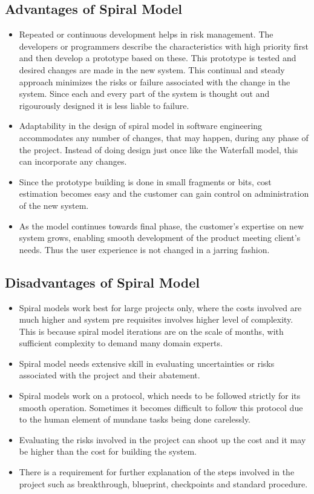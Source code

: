 \documentclass{article}
\begin{document}
\subsection{Advantages of Spiral Model}
\begin{itemize}
\item Repeated or continuous development helps in risk management. The developers or programmers describe the characteristics with high priority first and then develop a prototype based on these. This prototype is tested and desired changes are made in the new system. This continual and steady approach minimizes the risks or failure associated with the change in the system. Since each and every part of
the system is thought out and rigourously designed it is less liable to failure.
\item Adaptability in the design of spiral model in software engineering accommodates any number of changes, that may happen, during any phase of the project. Instead of doing design just once like the Waterfall model, this can incorporate any changes.
\item Since the prototype building is done in small fragments or bits, cost estimation becomes easy and the customer can gain control on administration of the new system.
\item As the model continues towards final phase, the customer's expertise on new system grows, enabling smooth development of the product meeting client's needs. Thus the user experience is not changed in a jarring fashion.
\end{itemize}

\subsection{Disadvantages of Spiral Model}
\begin{itemize}
\item Spiral models work best for large projects only, where the costs involved are much higher and system pre requisites involves higher level of complexity. This is because spiral model iterations are on the scale of months, with sufficient complexity to demand many domain experts.
\item Spiral model needs extensive skill in evaluating uncertainties or risks associated with the project and their abatement.
\item Spiral models work on a protocol, which needs to be followed strictly for its smooth operation. Sometimes it becomes difficult to follow this protocol due to the human element of mundane tasks being done carelessly.
\item Evaluating the risks involved in the project can shoot up the cost and it may be higher than the cost for building the system.
\item There is a requirement for further explanation of the steps involved in the project such as breakthrough, blueprint, checkpoints and standard procedure.
\end{itemize}
\end{document}
